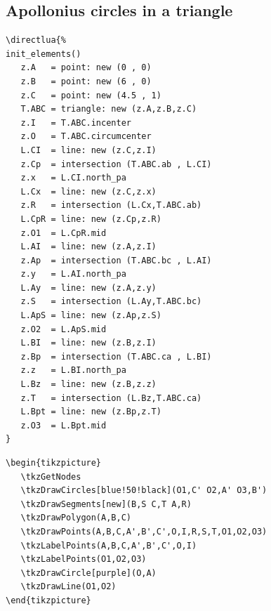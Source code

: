 
\subsection{Apollonius circles in a triangle} %
\label{sub:apollonius_circles}


\begin{Verbatim}
\directlua{%
init_elements()
   z.A   = point: new (0 , 0)
   z.B   = point: new (6 , 0)   
   z.C   = point: new (4.5 , 1)
   T.ABC = triangle: new (z.A,z.B,z.C)
   z.I   = T.ABC.incenter
   z.O   = T.ABC.circumcenter    
   L.CI  = line: new (z.C,z.I)
   z.Cp  = intersection (T.ABC.ab , L.CI)
   z.x   = L.CI.north_pa
   L.Cx  = line: new (z.C,z.x)
   z.R   = intersection (L.Cx,T.ABC.ab)
   L.CpR = line: new (z.Cp,z.R)
   z.O1  = L.CpR.mid   
   L.AI  = line: new (z.A,z.I)
   z.Ap  = intersection (T.ABC.bc , L.AI)
   z.y   = L.AI.north_pa
   L.Ay  = line: new (z.A,z.y)
   z.S   = intersection (L.Ay,T.ABC.bc)
   L.ApS = line: new (z.Ap,z.S)
   z.O2  = L.ApS.mid 
   L.BI  = line: new (z.B,z.I)
   z.Bp  = intersection (T.ABC.ca , L.BI)
   z.z   = L.BI.north_pa
   L.Bz  = line: new (z.B,z.z)
   z.T   = intersection (L.Bz,T.ABC.ca)
   L.Bpt = line: new (z.Bp,z.T)
   z.O3  = L.Bpt.mid
}
\end{Verbatim}
\begin{Verbatim}
\begin{tikzpicture}
   \tkzGetNodes
   \tkzDrawCircles[blue!50!black](O1,C' O2,A' O3,B')
   \tkzDrawSegments[new](B,S C,T A,R)
   \tkzDrawPolygon(A,B,C)
   \tkzDrawPoints(A,B,C,A',B',C',O,I,R,S,T,O1,O2,O3)
   \tkzLabelPoints(A,B,C,A',B',C',O,I)
   \tkzLabelPoints(O1,O2,O3)
   \tkzDrawCircle[purple](O,A)
   \tkzDrawLine(O1,O2)
\end{tikzpicture}
\end{Verbatim}



